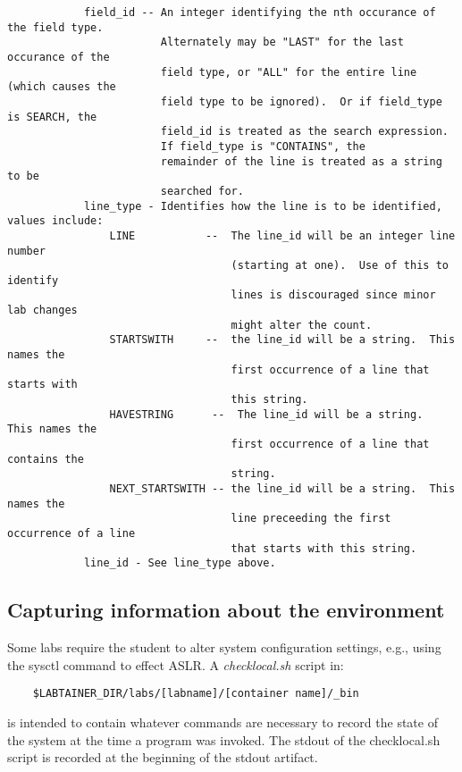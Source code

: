\documentclass[12pt]{article}
\begin{document}
\begin{verbatim}
            field_id -- An integer identifying the nth occurance of the field type.
                        Alternately may be "LAST" for the last occurance of the 
                        field type, or "ALL" for the entire line (which causes the 
                        field type to be ignored).  Or if field_type is SEARCH, the
                        field_id is treated as the search expression. 
                        If field_type is "CONTAINS", the 
                        remainder of the line is treated as a string to be 
                        searched for.
            line_type - Identifies how the line is to be identified, values include:
                LINE           --  The line_id will be an integer line number 
                                   (starting at one).  Use of this to identify 
                                   lines is discouraged since minor lab changes 
                                   might alter the count.
                STARTSWITH     --  the line_id will be a string.  This names the 
                                   first occurrence of a line that starts with 
                                   this string. 
                HAVESTRING      --  The line_id will be a string.  This names the 
                                   first occurrence of a line that contains the 
                                   string.
                NEXT_STARTSWITH -- the line_id will be a string.  This names the 
                                   line preceeding the first occurrence of a line 
                                   that starts with this string. 
            line_id - See line_type above.
\end{verbatim}

\subsection{Capturing information about the environment}
Some labs require the student to alter system configuration settings,
e.g., using the sysctl command to effect ASLR. A \textit{checklocal.sh} script in:
\begin{verbatim}
    $LABTAINER_DIR/labs/[labname]/[container name]/_bin
\end{verbatim}
is intended to contain whatever commands are necessary to record the 
state of the system at the time a program was invoked.  The stdout of
the checklocal.sh script is recorded at the beginning of the stdout artifact. 
\end{document}
